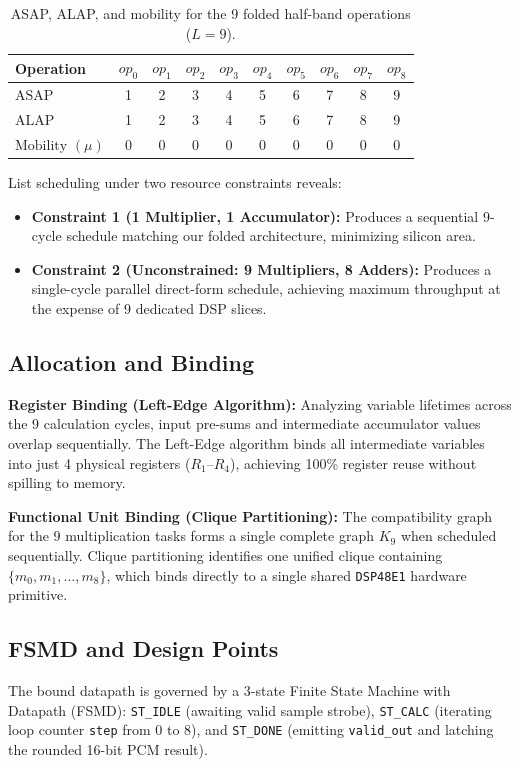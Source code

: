 \documentclass[11pt,a4paper]{article}
\begin{document}
\begin{table}[H]\centering\small
\caption{ASAP, ALAP, and mobility for the 9 folded half-band operations ($L=9$).}\label{tab:scheduling}
\begin{tabular}{@{}lccccccccc@{}}
\toprule
Operation & $op_0$ & $op_1$ & $op_2$ & $op_3$ & $op_4$ & $op_5$ & $op_6$ & $op_7$ & $op_8$\\
\midrule
$\text{ASAP}$ & 1 & 2 & 3 & 4 & 5 & 6 & 7 & 8 & 9\\
$\text{ALAP}$ & 1 & 2 & 3 & 4 & 5 & 6 & 7 & 8 & 9\\
$\text{Mobility } (\mu)$ & 0 & 0 & 0 & 0 & 0 & 0 & 0 & 0 & 0\\
\bottomrule
\end{tabular}
\end{table}

List scheduling under two resource constraints reveals:
\begin{itemize}
  \item \textbf{Constraint 1 (1 Multiplier, 1 Accumulator):} Produces a sequential 9-cycle schedule matching our folded architecture, minimizing silicon area.
  \item \textbf{Constraint 2 (Unconstrained: 9 Multipliers, 8 Adders):} Produces a single-cycle parallel direct-form schedule, achieving maximum throughput at the expense of 9 dedicated DSP slices.
\end{itemize}

\subsection{Allocation and Binding}
\textbf{Register Binding (Left-Edge Algorithm):} Analyzing variable lifetimes across the 9 calculation cycles, input pre-sums and intermediate accumulator values overlap sequentially. The Left-Edge algorithm binds all intermediate variables into just 4 physical registers ($R_1$--$R_4$), achieving 100\% register reuse without spilling to memory.

\textbf{Functional Unit Binding (Clique Partitioning):} The compatibility graph for the 9 multiplication tasks forms a single complete graph $K_9$ when scheduled sequentially. Clique partitioning identifies one unified clique containing $\{m_0, m_1, \dots, m_8\}$, which binds directly to a single shared \texttt{DSP48E1} hardware primitive.

\subsection{FSMD and Design Points}
The bound datapath is governed by a 3-state Finite State Machine with Datapath (FSMD): \texttt{ST\_IDLE} (awaiting valid sample strobe), \texttt{ST\_CALC} (iterating loop counter \texttt{step} from 0 to 8), and \texttt{ST\_DONE} (emitting \texttt{valid\_out} and latching the rounded 16-bit PCM result). 
\end{document}
